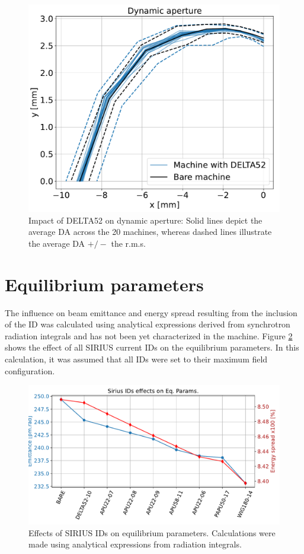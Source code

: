 \documentclass[a4paper,
               keeplastbox,   %
               ]{jacow}
\begin{document}
\begin{figure}[]
    \centering
   \includegraphics[width=0.6\columnwidth]{THPS18_f6.pdf}
   \caption{Impact of DELTA52 on dynamic aperture: Solid lines depict the average  DA across the 20 machines, whereas dashed lines illustrate the average DA $+/-$ the r.m.s.}
   \label{fig:dynapt}
\end{figure}

\section{Equilibrium parameters}
The influence on beam emittance and energy spread resulting from the inclusion of the ID was calculated using analytical expressions derived from synchrotron radiation integrals \cite{Lee:1999} and has not been yet characterized in the machine. Figure \ref{fig:eq_param} shows the effect of all SIRIUS current IDs on the equilibrium parameters. In this calculation, it was assumed that all IDs were set to their maximum field configuration.

\begin{figure}[]
    \centering
   \includegraphics[width=.95\columnwidth]{THPS18_f7.pdf}
   \caption{Effects of SIRIUS IDs on equilibrium parameters. Calculations were made using analytical expressions from radiation integrals.}
   \label{fig:eq_param}
\end{figure}
\end{document}
